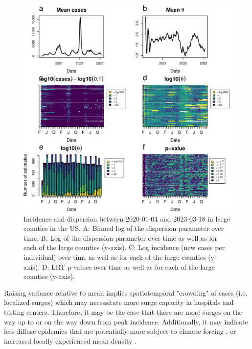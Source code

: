\documentclass[10pt,letterpaper]{article}
\begin{document}
\begin{figure}[!h]
\includegraphics[width=1\textwidth]{fig3}
\caption{
Incidence and dispersion between 2020-01-04 and 2023-03-18 in large counties in the US. A: Binned log of the dispersion parameter over time. B: Log of the dispersion parameter over time as well as for each of the large counties (y-axis). C: Log incidence (new cases per individual) over time as well as for each of the large counties (y-axis). D: LRT p-values over time as well as for each of the large counties (y-axis).
}
\label{fig3}
\end{figure}

\noindent Raising variance relative to mean implies spatiotemporal "crowding" of cases (i.e. localized surges) which may necessitate more surge capacity in hospitals and testing centers. Therefore, it may be the case that there are more surges on the way up to or on the way down from peak incidence. 
Additionally, it may indicate less diffuse epidemics that are potentially more subject to climate forcing \cite{dalziel_urbanization_2018}, or increased locally experienced mean density \cite{lloyd_mean_1967}. 
\end{document}

